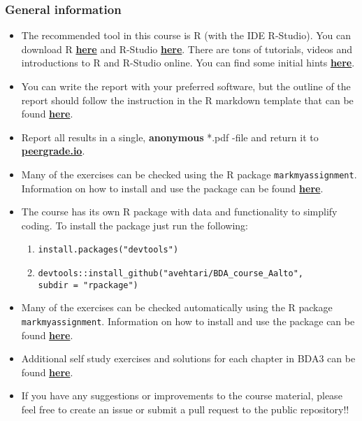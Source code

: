 
\subsubsection*{General information}


\begin{itemize}
\itemsep0em 
\item The recommended tool in this course is R (with the IDE R-Studio). You can download R \href{https://cran.r-project.org/}{\textbf{here}} and R-Studio \href{https://www.rstudio.com/products/rstudio/download/}{\textbf{here}}. There are tons of tutorials, videos and introductions to R and R-Studio online. You can find some initial hints \href{https://www.rstudio.com/online-learning/}{\textbf{here}}. 
\item  You can write the report with your preferred software, but the outline of the report should follow the instruction in the R markdown template that can be found \href{https://raw.githubusercontent.com/avehtari/BDA_course_Aalto/master/templates/assignment_template.rmd}{\textbf{here}}. 
\item  Report all results in a single, {\bf anonymous} *.pdf -file and return it to \href{peergrade.io}{\textbf{peergrade.io}}. 
\item Many of the exercises can be checked using the R package \texttt{markmyassignment}. Information on how to install and use the package can be found \href{https://cran.r-project.org/web/packages/markmyassignment/vignettes/markmyassignment.html}{\textbf{here}}.
\item The course has its own R package with data and functionality to simplify coding. To install the package just run the following:
\begin{enumerate}
\item \texttt{install.packages("devtools")}
\item \texttt{devtools::install\_github("avehtari/BDA\_course\_Aalto", \\ subdir = "rpackage")}
\end{enumerate}
\item Many of the exercises can be checked automatically using the R package \\ \texttt{markmyassignment}. Information on how to install and use the package can be found \href{https://cran.r-project.org/web/packages/markmyassignment/vignettes/markmyassignment.html}{\textbf{here}}.
\item Additional self study exercises and solutions for each chapter in BDA3 can be found \href{http://www.stat.columbia.edu/~gelman/book/solutions3.pdf}{\textbf{here}}.
\item If you have any suggestions or improvements to the course material, please feel free to create an issue or submit a pull request to the public repository!!
\end{itemize}